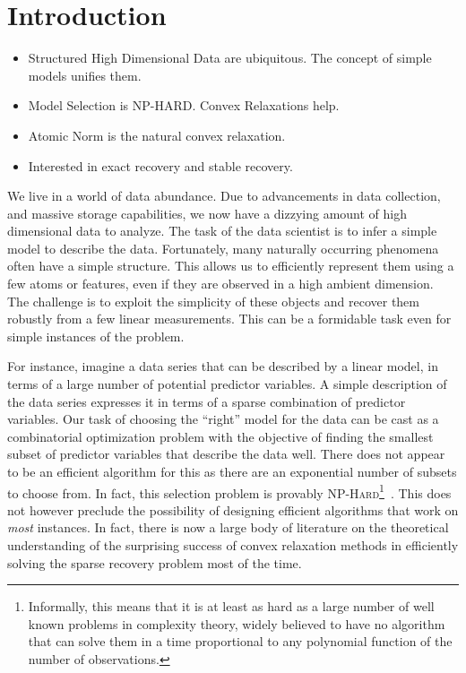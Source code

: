 \chapter{Introduction}

\begin{itemize}
  \item Structured High Dimensional Data are ubiquitous. The concept of simple models unifies them.
  \item Model Selection is NP-HARD. Convex Relaxations help.
  \item Atomic Norm is the natural convex relaxation.
  \item Interested in exact recovery and stable recovery.
\end{itemize}

We live in a world of data abundance. Due to advancements in data collection,
and massive storage capabilities, we now have a dizzying amount of high
dimensional data to analyze. The task of the data scientist is to infer a simple
model to describe the data. Fortunately, many naturally occurring phenomena
often have a simple structure. This allows us to efficiently represent them
using a few atoms or features, even if they are observed in a high ambient
dimension. The challenge is to exploit the simplicity of these objects and
recover them robustly from a few linear measurements. This can be a formidable
task even for simple instances of the problem.


For instance, imagine a data series that can be described by a linear model, in
terms of a large number of potential predictor variables. A simple description
of the data series expresses it in terms of a sparse combination of predictor
variables. Our task of choosing the ``right'' model for the data can be cast as
a combinatorial optimization problem with the objective of finding the smallest
subset of predictor variables that describe the data well. There does not
appear to be an efficient algorithm for this as there are an exponential number
of subsets to choose from. In fact, this selection problem is provably
\textsc{NP-Hard}\footnote{Informally, this means that it is at least as hard as
a large number of well known problems in complexity theory, widely believed to
have no algorithm that can solve them in a time proportional to any polynomial
function of the number of observations.}~\cite{Natarajan95}. This does not
however preclude the possibility of designing efficient algorithms that work on
\emph{most} instances. In fact, there is now a large body of literature on the
theoretical understanding of the surprising success of convex relaxation
methods in efficiently solving the sparse recovery problem most of the time.

